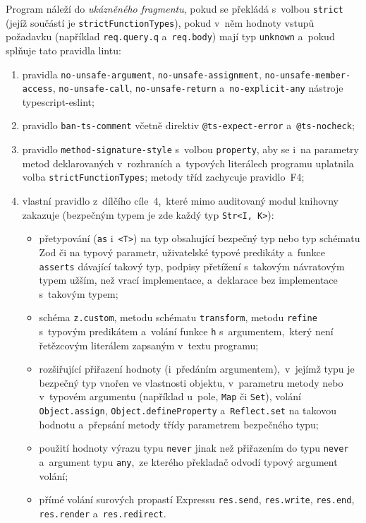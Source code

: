 \begin{definice}
\label{def:fragment}
Program náleží do \emph{ukázněného fragmentu}, pokud se překládá s~volbou \texttt{strict} (jejíž součástí je \texttt{strictFunctionTypes}), pokud v~něm hodnoty vstupů požadavku (například \texttt{req.query.q} a~\texttt{req.body}) mají typ \texttt{unknown} a~pokud splňuje tato pravidla lintu:
\begin{enumerate}[label=(F\arabic*)]
    \item {\raggedright pravidla \texttt{no-unsafe-argument}, \texttt{no-unsafe-assignment}, \texttt{no-unsafe-member-access}, \texttt{no-unsafe-call}, \texttt{no-unsafe-return} a~\texttt{no-explicit-any} nástroje \mbox{typescript-eslint};\par}
    \item pravidlo \texttt{ban-ts-comment} včetně direktiv \texttt{@ts-expect-error} a~\texttt{@ts-nocheck};
    \item pravidlo \texttt{method-signature-style} s~volbou \texttt{property}, aby se i~na parametry metod deklarovaných v~rozhraních a~typových literálech programu uplatnila volba \texttt{strictFunctionTypes}; metody tříd zachycuje pravidlo~F4;
    \item vlastní pravidlo z~dílčího cíle~4,~které mimo auditovaný modul knihovny zakazuje (bezpečným typem je zde každý typ \texttt{Str<I, K>}):
    \begin{itemize}
        \item přetypování (\texttt{as} i~\texttt{<T>}) na typ obsahující bezpečný typ nebo typ schématu Zod či na typový parametr, uživatelské typové predikáty a~funkce \texttt{asserts} dávající takový typ, podpisy přetížení s~takovým návratovým typem užším, než vrací implementace, a~deklarace bez implementace s~takovým typem;
        \item schéma \texttt{z.custom}, metodu schématu \texttt{transform}, metodu \texttt{refine} s~typovým predikátem a~volání funkce \texttt{h} s~argumentem,~který není řetězcovým literálem zapsaným v~textu programu;
        \item rozšiřující přiřazení hodnoty (i~předáním argumentem),~v~jejímž typu je bezpečný typ vnořen ve vlastnosti objektu, v~parametru metody nebo v~typovém argumentu (například u~pole, \texttt{Map} či \texttt{Set}), volání \texttt{Object.assign}, \texttt{Object.defineProperty} a~\texttt{Reflect.set} na takovou hodnotu a~přepsání metody třídy parametrem bezpečného typu;
        \item použití hodnoty výrazu typu \texttt{never} jinak než přiřazením do typu \texttt{never} a~argument typu \texttt{any},~ze kterého překladač odvodí typový argument volání;
        \item přímé volání surových propastí Expressu \texttt{res.send}, \texttt{res.write}, \texttt{res.end}, \texttt{res.render} a~\texttt{res.redirect}.
    \end{itemize}
\end{enumerate}
\end{definice}

